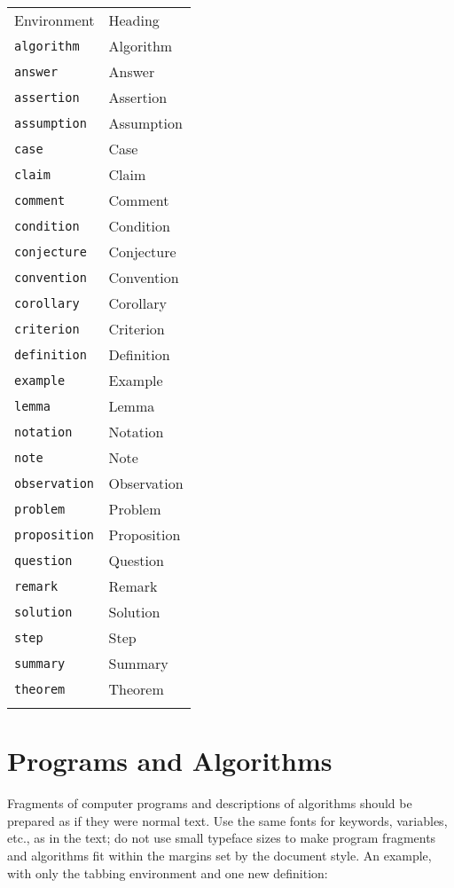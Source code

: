 \begin{center}
{\tablefont
\begin{tabular}{ll}
\toprule Environment & Heading\\\colrule
\verb|algorithm| & Algorithm\\
\verb|answer| & Answer\\
\verb|assertion| & Assertion\\
\verb|assumption| & Assumption\\
\verb|case| & Case\\
\verb|claim| & Claim\\
\verb|comment| & Comment\\
\verb|condition| & Condition\\
\verb|conjecture| & Conjecture\\
\verb|convention| & Convention\\
\verb|corollary| & Corollary\\
\verb|criterion| & Criterion\\
\verb|definition| & Definition\\
\verb|example| & Example\\
\verb|lemma| & Lemma\\
\verb|notation| & Notation\\
\verb|note| & Note\\
\verb|observation| & Observation\\
\verb|problem| & Problem\\
\verb|proposition| & Proposition\\
\verb|question| & Question\\
\verb|remark| & Remark\\
\verb|solution| & Solution\\
\verb|step| & Step\\
\verb|summary| & Summary\\
\verb|theorem| & Theorem\\\botrule
\end{tabular}}\label{theo}
\end{center}

\section{Programs and Algorithms}
Fragments of computer programs and descriptions of algorithms should
be prepared as if they were normal text. Use the same fonts for
keywords, variables, etc., as in the text; do not use small typeface
sizes to make program fragments and algorithms fit within the
margins set by the document style. An example, with only the tabbing
environment and one new definition:


